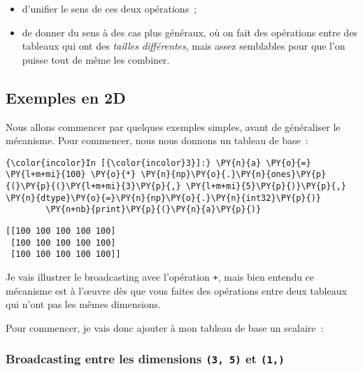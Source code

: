 \begin{itemize}
\tightlist
\item
  d'unifier le sens de ces deux opérations~;
\item
  de donner du sens à des cas plus généraux, où on fait des opérations
  entre des tableaux qui ont des \emph{tailles différentes}, mais assez
  semblables pour que l'on puisse tout de même les combiner.
\end{itemize}

    \hypertarget{exemples-en-2d}{%
\subsection{Exemples en 2D}\label{exemples-en-2d}}

    Nous allons commencer par quelques exemples simples, avant de
généraliser le mécanisme. Pour commencer, nous nous donnons un tableau
de base~:

    \begin{Verbatim}[commandchars=\\\{\},frame=single,framerule=0.3mm,rulecolor=\color{cellframecolor}]
{\color{incolor}In [{\color{incolor}3}]:} \PY{n}{a} \PY{o}{=} \PY{l+m+mi}{100} \PY{o}{*} \PY{n}{np}\PY{o}{.}\PY{n}{ones}\PY{p}{(}\PY{p}{(}\PY{l+m+mi}{3}\PY{p}{,} \PY{l+m+mi}{5}\PY{p}{)}\PY{p}{,} \PY{n}{dtype}\PY{o}{=}\PY{n}{np}\PY{o}{.}\PY{n}{int32}\PY{p}{)}
        \PY{n+nb}{print}\PY{p}{(}\PY{n}{a}\PY{p}{)}
\end{Verbatim}


    \begin{Verbatim}[commandchars=\\\{\},frame=single,framerule=0.3mm,rulecolor=\color{cellframecolor}]
[[100 100 100 100 100]
 [100 100 100 100 100]
 [100 100 100 100 100]]
\end{Verbatim}

    Je vais illustrer le broadcasting avec l'opération \texttt{+}, mais bien
entendu ce mécanisme est à l'œuvre dès que vous faites des opérations
entre deux tableaux qui n'ont pas les mêmes dimensions.

Pour commencer, je vais donc ajouter à mon tableau de base un scalaire~:

    \hypertarget{broadcasting-entre-les-dimensions-3-5-et-1}{%
\subsubsection{\texorpdfstring{Broadcasting entre les dimensions
\texttt{(3,\ 5)} et
\texttt{(1,)}}{Broadcasting entre les dimensions (3, 5) et (1,)}}\label{broadcasting-entre-les-dimensions-3-5-et-1}}


